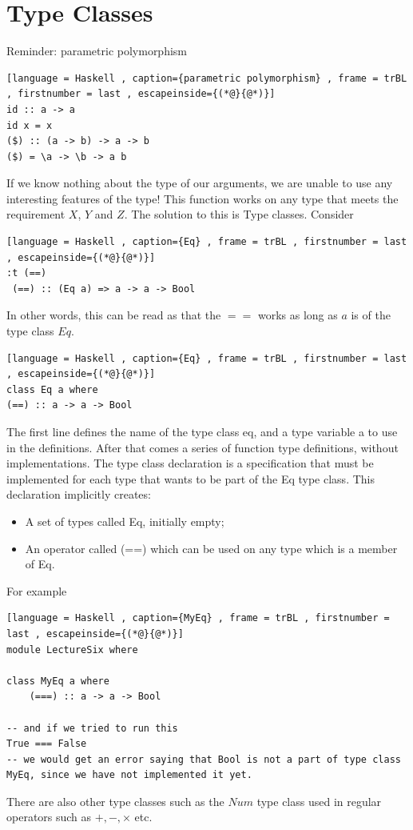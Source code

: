 \documentclass[a4paper]{article}
\theoremstyle{plain}
\theoremstyle{definition}
\theoremstyle{remark}
\begin{document}
\section{Type Classes}
Reminder: parametric polymorphism
\begin{lstlisting}[language = Haskell , caption={parametric polymorphism} , frame = trBL , firstnumber = last , escapeinside={(*@}{@*)}]
id :: a -> a
id x = x
($) :: (a -> b) -> a -> b
($) = \a -> \b -> a b
\end{lstlisting}
If we know nothing about the type of our arguments, we are unable to use any interesting features of the type!
This function works on any type that meets the requirement $X$, $Y$ and $Z$. The solution to this is Type classes. Consider
\begin{lstlisting}[language = Haskell , caption={Eq} , frame = trBL , firstnumber = last , escapeinside={(*@}{@*)}]
:t (==)
 (==) :: (Eq a) => a -> a -> Bool
\end{lstlisting}
In other words, this can be read as that the $==$ works as long as $a$ is of the type class $Eq$.
\begin{lstlisting}[language = Haskell , caption={Eq} , frame = trBL , firstnumber = last , escapeinside={(*@}{@*)}]
class Eq a where
(==) :: a -> a -> Bool
\end{lstlisting}
The first line defines the name of the type class eq, and a type variable a to use in the definitions. After that comes a series of function type definitions, without implementations. The type class declaration is a specification that must be implemented for each type that wants to be part of the Eq type class. This declaration implicitly creates:
\begin{itemize}
	\item A set of types called Eq, initially empty;
	\item An operator called (==) which can be used on any type which is a member of Eq.
\end{itemize}
For example
\begin{lstlisting}[language = Haskell , caption={MyEq} , frame = trBL , firstnumber = last , escapeinside={(*@}{@*)}]
module LectureSix where

class MyEq a where
	(===) :: a -> a -> Bool

-- and if we tried to run this
True === False
-- we would get an error saying that Bool is not a part of type class MyEq, since we have not implemented it yet.
\end{lstlisting}
There are also other type classes such as the $Num$ type class used in regular operators such as $+, -, \times $ etc.
\end{document}

